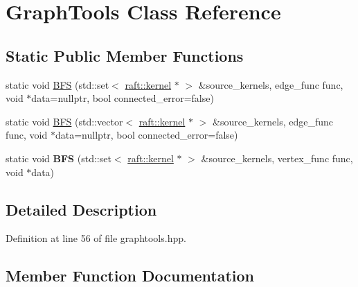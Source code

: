 \hypertarget{class_graph_tools}{}\section{Graph\+Tools Class Reference}
\label{class_graph_tools}
\subsection*{Static Public Member Functions}
\begin{DoxyCompactItemize}
\item 
static void \hyperlink{class_graph_tools_ade51007699cbd681c1a37946609c46ee}{B\+FS} (std\+::set$<$ \hyperlink{classraft_1_1kernel}{raft\+::kernel} $\ast$ $>$ \&source\+\_\+kernels, edge\+\_\+func func, void $\ast$data=nullptr, bool connected\+\_\+error=false)
\item 
static void \hyperlink{class_graph_tools_afc9c2852a351fe8b1a881b5d8b6c97f5}{B\+FS} (std\+::vector$<$ \hyperlink{classraft_1_1kernel}{raft\+::kernel} $\ast$ $>$ \&source\+\_\+kernels, edge\+\_\+func func, void $\ast$data=nullptr, bool connected\+\_\+error=false)
\item 
\hypertarget{class_graph_tools_a4223eca1b9bdb5b2b551f79b1faa155f}{}\label{class_graph_tools_a4223eca1b9bdb5b2b551f79b1faa155f} 
static void {\bfseries B\+FS} (std\+::set$<$ \hyperlink{classraft_1_1kernel}{raft\+::kernel} $\ast$ $>$ \&source\+\_\+kernels, vertex\+\_\+func func, void $\ast$data)
\end{DoxyCompactItemize}


\subsection{Detailed Description}


Definition at line 56 of file graphtools.\+hpp.



\subsection{Member Function Documentation}
\hypertarget{class_graph_tools_ade51007699cbd681c1a37946609c46ee}{}\label{class_graph_tools_ade51007699cbd681c1a37946609c46ee} 
